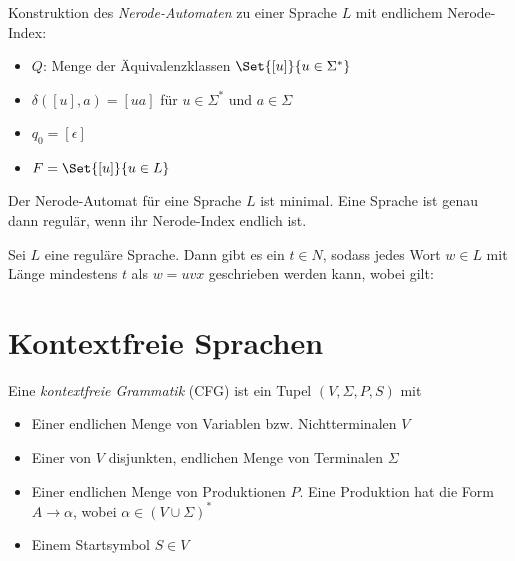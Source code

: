 \documentclass{cheat-sheet}
\begin{document}
\begin{alg}
Konstruktion des \emph{Nerode-Automaten} zu einer Sprache $L$ mit endlichem Nerode-Index:
\end{alg}

\begin{itemize}
  \item $Q$: Menge der Äquivalenzklassen $\Set{[u]}{u \in \Sigma^{*}}$
  \item $\delta([u], a) = [ua]$ für $u \in \Sigma^{*}$ und $a \in \Sigma$
  \item $q_{0} = [ \epsilon ]$
  \item $F = \Set{ [u] }{ u \in L }$
\end{itemize}

\begin{bem}
Der Nerode-Automat für eine Sprache $L$ ist minimal. Eine Sprache ist genau dann regulär, wenn ihr Nerode-Index endlich ist.
\end{bem}

\begin{satz}
  Sei $L$ eine reguläre Sprache. Dann gibt es ein $t \in N$, sodass jedes Wort $w \in L$ mit Länge mindestens $t$ als $w = uvx$ geschrieben werden kann, wobei gilt:

  \begin{itemize}
  \end{itemize}
\end{satz}



\section{Kontextfreie Sprachen}

\begin{defn}
Eine \emph{kontextfreie Grammatik} (CFG) ist ein Tupel $(V, \Sigma, P, S)$ mit

\begin{itemize}
  \item Einer endlichen Menge von Variablen bzw. Nichtterminalen $V$
  \item Einer von $V$ disjunkten, endlichen Menge von Terminalen $\Sigma$
  \item Einer endlichen Menge von Produktionen $P$. Eine Produktion hat die Form $A \longrightarrow \alpha$, wobei $\alpha \in (V \cup \Sigma)^{*}$
  \item Einem Startsymbol $S \in V$
\end{itemize}
\end{defn}
\end{document}
